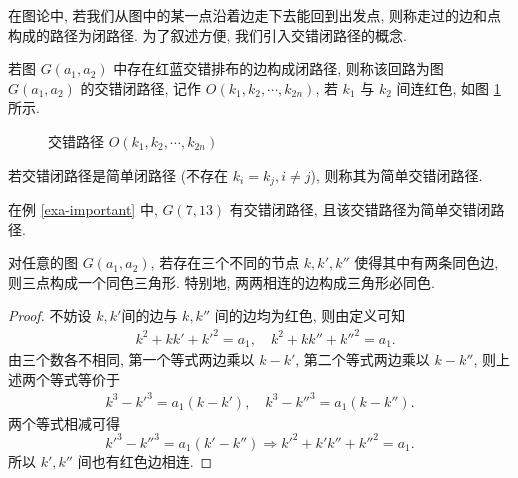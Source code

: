 在图论中, 若我们从图中的某一点沿着边走下去能回到出发点, 则称走过的边和点构成的路径为闭路径. 为了叙述方便, 我们引入交错闭路径的概念.
\begin{definition}
    若图 $G(a_1,a_2)$  中存在红蓝交错排布的边构成闭路径, 则称该回路为图 $G(a_1,a_2)$ 的交错闭路径, 记作 $O(k_1,k_2,\cdots,k_{2n})$, 若 $k_1$ 与 $k_2$ 间连红色, 如图 \ref{fig:cross-circle} 所示.
    \begin{figure}[htbp]
        \centering
        \caption{交错路径 $O(k_1,k_2,\cdots,k_{2n})$}
        \label{fig:cross-circle}
    \end{figure}
    若交错闭路径是简单闭路径 (不存在 $k_i=k_j,i\neq j$), 则称其为简单交错闭路径.
\end{definition}

在例 \ref{exa-important} 中, $G(7,13)$ 有交错闭路径, 且该交错路径为简单交错闭路径.
\begin{lemma}\label{lma-3-3-2}
对任意的图 $G(a_1,a_2)$, 若存在三个不同的节点 $k,k',k''$ 使得其中有两条同色边, 则三点构成一个同色三角形. 特别地, 两两相连的边构成三角形必同色. 
\end{lemma}
\begin{proof}
不妨设 $k,k'$间的边与 $k,k''$ 间的边均为红色, 则由定义可知
\begin{align*}
    & k^2+kk'+k'^2=a_1,\quad  k^2+kk''+k''^2=a_1.
\end{align*}
由三个数各不相同, 第一个等式两边乘以 $k-k'$, 第二个等式两边乘以 $k-k''$, 则上述两个等式等价于
\begin{align*}
    k^3-k'^3=a_1(k-k'),\quad k^3-k''^3=a_1(k-k'').
\end{align*}
两个等式相减可得
\begin{equation*}
    k'^3-k''^3=a_1(k'-k'')\Longrightarrow k'^2+k'k''+k''^2=a_1. 
\end{equation*}
所以 $k',k''$ 间也有红色边相连.
\end{proof}


